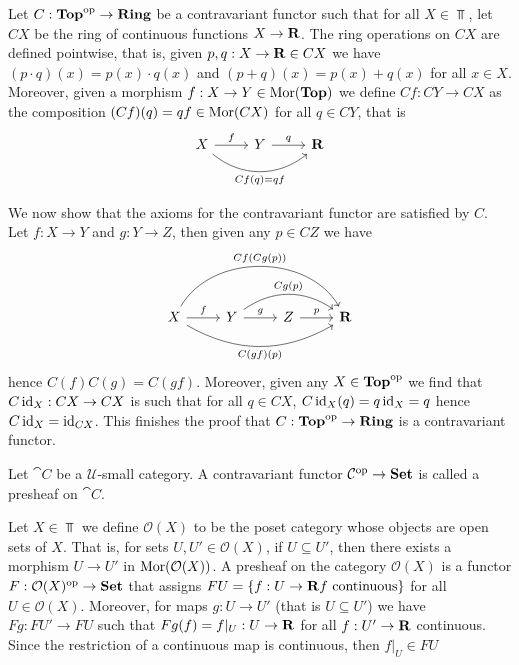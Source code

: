 \begin{example}[\(\Top^\op \to \Rng\)]
Let \(C: {\textbf{Top}}^{\mathrm{op}} \to {\textbf{Ring}}\) be a contravariant functor such that
for all \(X \in \Top\), let \(C X\) be the ring of continuous functions
\(X \to \mathbf{R}\). The ring operations on \(C X\) are defined pointwise,
that is, given \(p, q: X \to \mathbf{R} \in C X\) we have \((p \cdot q) (x) =
p(x) \cdot q(x)\) and \((p + q)(x) = p(x) + q(x)\) for all \(x \in X\).
Moreover, given a morphism \(f: X \to Y \in \operatorname{Mor}({\textbf{Top}})\) we define \(C f:
C Y \to C X\) as the composition \((C f)(q) = q f \in \operatorname{Mor}(C X)\) for all \(q
\in C Y\), that is
\[
  \begin{tikzcd}
    X \ar[r, "f"] \ar[rr, bend right = 40, swap, "C f(q) = q f"]
    & Y \ar[r, "q"] & \R
  \end{tikzcd}
\]

We now show that the axioms for the contravariant functor are satisfied by
\(C\). Let \(f: X \to Y\) and \(g: Y \to Z\), then given any \(p \in C Z\) we
have
\[
  \begin{tikzcd}
    X \ar[r, "f"]
    \ar[rrr, bend left = 60, "C f(C g (p))"]
    \ar[rrr, bend right, swap, "C (g f)(p)"]
    & Y \ar[r, "g"]
    \ar[rr, bend left = 35, "C g(p)"]
    & Z \ar[r, "p"] & \R
  \end{tikzcd}
\]
hence \(C (f) C (g) = C (g f)\). Moreover, given any \(X \in {\textbf{Top}}^{\mathrm{op}}\) we find
that \(C \operatorname{id}_X: C X \to C X\) is such that for all \(q \in C X\),
\(C \operatorname{id}_X (q) = q \operatorname{id}_X = q\) hence \(C \operatorname{id}_X = \operatorname{id}_{C X}\). This finishes the
proof that \(C: {\textbf{Top}}^{\mathrm{op}} \to {\textbf{Ring}}\) is a contravariant functor.
\end{example}

\begin{definition}[Presheaf]\label{def: presheaf}
Let \(\cat C\) be a \(\mathcal U\)-small category. A contravariant functor
\(\mathcal C^{\mathrm{op}} \to {\textbf{Set}}\) is called a presheaf on \(\cat C\).
\end{definition}

\begin{example}
Let \(X \in \Top\) we define \(\mathcal O(X)\) to be the poset category whose
objects are open sets of \(X\). That is, for sets \(U, U' \in \mathcal O(X)\), if
\(U \subseteq U'\), then there exists a morphism \(U \to U'\) in
\(\operatorname{Mor}(\mathcal O(X))\). A presheaf on the category \(\mathcal O(X)\) is a
functor \(F: \mathcal O(X)^{\mathrm{op}} \to {\textbf{Set}}\) that assigns
\(F U = \{f: U \to \mathbf{R} \relax f \text{ continuous}\}\) for all
\(U \in \mathcal O(X)\).  Moreover, for maps \(g: U \to U'\) (that is
\(U \subseteq U'\)) we have \(F g: F U' \to F U\) such that
\(F g(f) = f|_U: U \to \mathbf{R}\) for all \(f: U' \to \mathbf{R}\) continuous. Since the
restriction of a continuous map is continuous, then \(f|_U \in F U\)
\end{example}

